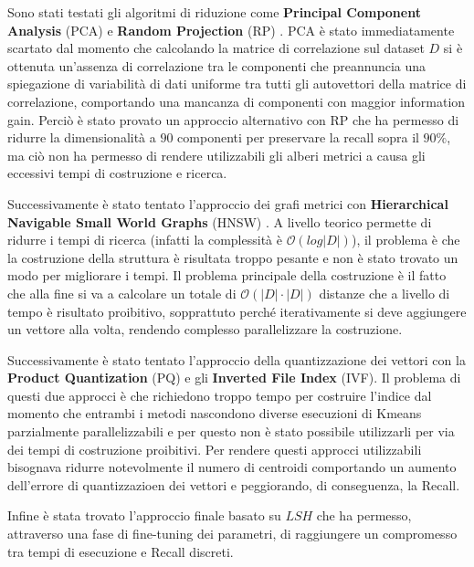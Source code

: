 Sono stati testati gli algoritmi di riduzione come \textbf{Principal Component Analysis} (PCA) \cite{pca}
e \textbf{Random Projection} (RP) \cite{rp}. PCA è stato immediatamente scartato dal momento che 
calcolando la matrice di correlazione sul dataset $D$ si è ottenuta un'assenza 
di correlazione tra le componenti che preannuncia una spiegazione di variabilità 
di dati uniforme tra tutti gli autovettori della matrice di correlazione, comportando 
una mancanza di componenti con maggior information gain. Perciò è stato provato 
un approccio alternativo con RP che ha permesso di ridurre la 
dimensionalità a $90$ componenti per preservare la recall sopra il $90\%$, ma 
ciò non ha permesso di rendere utilizzabili gli alberi metrici a causa gli eccessivi 
tempi di costruzione e ricerca.

Successivamente è stato tentato l'approccio dei grafi metrici con \textbf{Hierarchical 
Navigable Small World Graphs} (HNSW) \cite{hnsw}. A livello teorico permette di ridurre i tempi
di ricerca (infatti la complessità è $\mathcal{O}(log |D|)$), il problema è 
che la costruzione della struttura è risultata troppo pesante e non è stato trovato 
un modo per migliorare i tempi. Il problema principale della costruzione è 
il fatto che alla fine si va a calcolare un totale di $\mathcal{O}(|D|\cdot |D|)$
distanze che a livello di tempo è risultato proibitivo, sopprattuto perché 
iterativamente si deve aggiungere un vettore alla volta, rendendo complesso parallelizzare 
la costruzione.

Successivamente è stato tentato l'approccio della quantizzazione dei vettori con 
la \textbf{Product Quantization} (PQ) \cite{pq} e gli \textbf{Inverted File Index} (IVF)\cite{pq}. Il problema di questi 
due approcci è che richiedono troppo tempo per costruire l'indice dal momento che 
entrambi i metodi nascondono diverse esecuzioni di Kmeans parzialmente parallelizzabili
e per questo non è stato possibile utilizzarli per via dei tempi di costruzione 
proibitivi. Per rendere questi approcci utilizzabili bisognava ridurre notevolmente 
il numero di centroidi comportando un aumento dell'errore di quantizzazioen dei 
vettori e peggiorando, di conseguenza, la Recall.

Infine è stata trovato l'approccio finale basato su $LSH$ che ha permesso, attraverso 
una fase di fine-tuning dei parametri, di raggiungere un compromesso tra tempi di 
esecuzione e Recall discreti.








